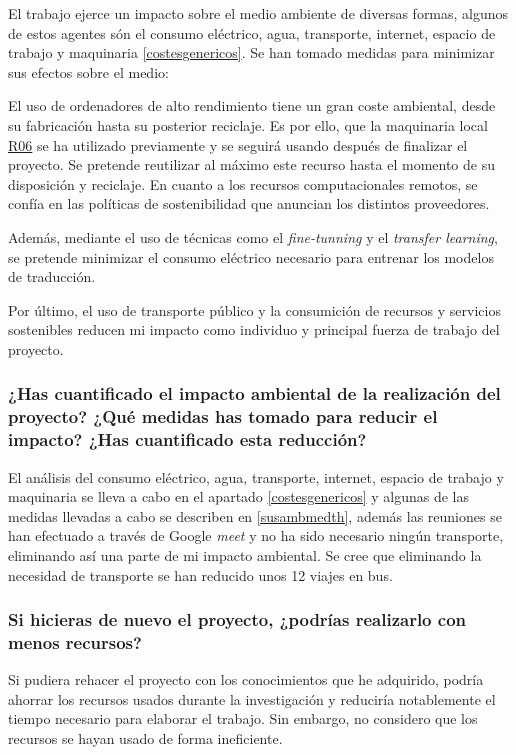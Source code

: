 El trabajo ejerce un impacto sobre el medio ambiente de diversas formas, algunos de estos
agentes són el consumo eléctrico, agua, transporte, internet, espacio de trabajo y maquinaria \ref{costesgenericos}.
Se han tomado medidas para minimizar sus efectos sobre el medio:

El uso de ordenadores de alto rendimiento tiene un gran coste ambiental,
desde su fabricación hasta su posterior reciclaje. Es por ello, que la maquinaria
local \hyperref[R06]{R06} se ha utilizado previamente y se seguirá usando después de
finalizar el proyecto. Se pretende reutilizar al máximo este recurso hasta el
momento de su disposición y reciclaje.
En cuanto a los recursos computacionales remotos, se confía en las políticas de sostenibilidad
\cite{awssustainability} que anuncian los distintos proveedores.

Además, mediante el uso de técnicas como el \textit{fine-tunning} y el
\textit{transfer learning}, se pretende minimizar el consumo eléctrico necesario para
entrenar los modelos de traducción.

Por último, el uso de transporte público y la consumición de recursos y servicios sostenibles
reducen mi impacto como individuo y principal fuerza de trabajo del proyecto. 

\subsubsection{¿Has cuantificado el impacto ambiental de la realización del proyecto? ¿Qué medidas has tomado para reducir el impacto? ¿Has cuantificado esta reducción?}

El análisis del consumo eléctrico, agua, transporte, internet, espacio de trabajo y maquinaria se lleva a cabo en el apartado \ref{costesgenericos} y algunas de las medidas llevadas a cabo se describen en \ref{susambmedth}, además las reuniones se han efectuado a través de Google \textit{meet} y no ha sido necesario ningún transporte, eliminando así una parte de mi impacto ambiental.
Se cree que eliminando la necesidad de transporte se han reducido unos 12 viajes en bus.

\subsubsection{Si hicieras de nuevo el proyecto, ¿podrías realizarlo con menos recursos?}

Si pudiera rehacer el proyecto con los conocimientos que he adquirido, podría ahorrar los recursos usados durante la investigación y reduciría notablemente el tiempo necesario para elaborar el trabajo. Sin embargo, no considero que los recursos se hayan usado de forma ineficiente.

